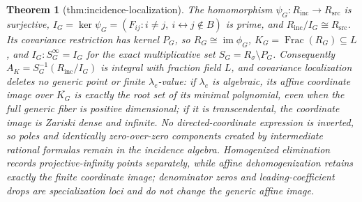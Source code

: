 \documentclass{article}
\newtheorem{theorem}{Theorem}
\begin{document}
\begin{theorem}[thm:incidence-localization]\label{thm:incidence-localization}
The homomorphism \(\psi_G:R_{\mathrm{inc}}\to R_{\mathrm{src}}\) is surjective, \(I_G=\ker\psi_G=(F_{ij}:i\ne j,\ i\leftrightarrow j\notin B)\) is prime, and \(R_{\mathrm{inc}}/I_G\cong R_{\mathrm{src}}\). Its covariance restriction has kernel \(P_G\), so \(R_G\cong\operatorname{im}\phi_G\), \(K_G=\operatorname{Frac}(R_G)\subseteq L\), and \(I_G:S_G^{\infty}=I_G\) for the exact multiplicative set \(S_G=R_{\sigma}\setminus P_G\). Consequently \(A_K=S_G^{-1}(R_{\mathrm{inc}}/I_G)\) is integral with fraction field \(L\), and covariance localization deletes no generic point or finite \(\lambda_e\)-value: if \(\lambda_e\) is algebraic, its affine coordinate image over \(\overline{K_G}\) is exactly the root set of its minimal polynomial, even when the full generic fiber is positive dimensional; if it is transcendental, the coordinate image is Zariski dense and infinite. No directed-coordinate expression is inverted, so poles and identically zero-over-zero components created by intermediate rational formulas remain in the incidence algebra. Homogenized elimination records projective-infinity points separately, while affine dehomogenization retains exactly the finite coordinate image; denominator zeros and leading-coefficient drops are specialization loci and do not change the generic affine image.
\end{theorem}
\end{document}
